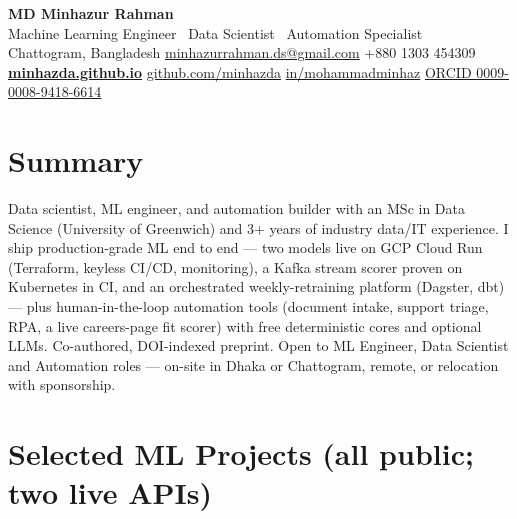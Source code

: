 \documentclass[10pt,a4paper]{article}
\begin{document}
\begin{center}
  {\LARGE\bfseries\color{accent} MD Minhazur Rahman}\\[2pt]
  {\large Machine Learning Engineer \textperiodcentered\ Data Scientist \textperiodcentered\ Automation Specialist}\\[3pt]
  {\small\color{muted}
    Chattogram, Bangladesh \quad
    \href{mailto:minhazurrahman.ds@gmail.com}{minhazurrahman.ds@gmail.com} \quad
    +880 1303 454309}\\[2pt]
  {\small
    \href{https://minhazda.github.io}{\textbf{minhazda.github.io}} \quad
    \href{https://github.com/minhazda}{github.com/minhazda} \quad
    \href{https://www.linkedin.com/in/mohammadminhaz/}{in/mohammadminhaz} \quad
    \href{https://orcid.org/0009-0008-9418-6614}{ORCID 0009-0008-9418-6614}}
\end{center}

\section{Summary}
Data scientist, ML engineer, and automation builder with an MSc in Data Science (University of
Greenwich) and 3+ years of industry data/IT experience. I ship production-grade ML end to end ---
two models live on GCP Cloud Run (Terraform, keyless CI/CD, monitoring), a Kafka stream scorer proven
on Kubernetes in CI, and an orchestrated weekly-retraining platform (Dagster, dbt) --- plus
human-in-the-loop automation tools (document intake, support triage, RPA, a live careers-page fit
scorer) with free deterministic cores and optional LLMs. Co-authored, DOI-indexed preprint. Open to ML
Engineer, Data Scientist and Automation roles --- on-site in Dhaka or Chattogram, remote, or
relocation with sponsorship.

\section{Selected ML Projects \textnormal{\small (all public; two live APIs)}}
\end{document}
